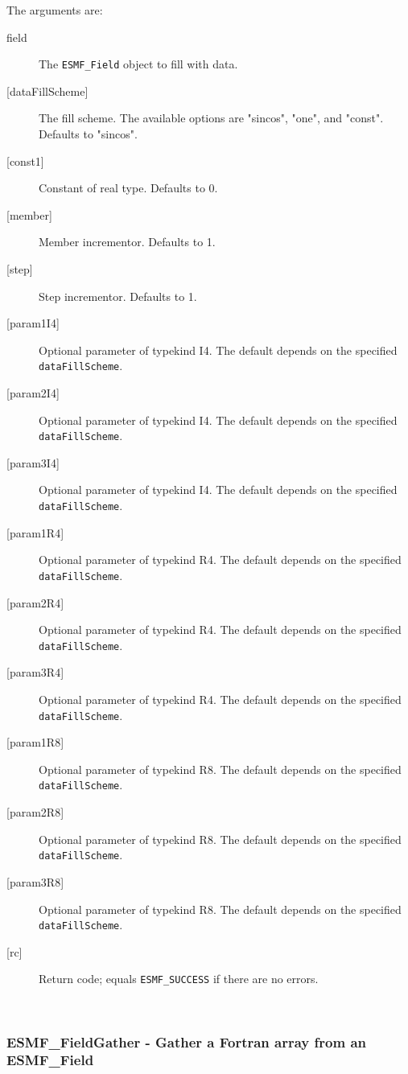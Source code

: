    The arguments are:
   \begin{description}
   \item[field]
   The {\tt ESMF\_Field} object to fill with data.
   \item[{[dataFillScheme]}]
   The fill scheme. The available options are "sincos", "one", and "const".
   Defaults to "sincos".
   \item[{[const1]}]
   Constant of real type. Defaults to 0.
   \item[{[member]}]
   Member incrementor. Defaults to 1.
   \item[{[step]}]
   Step incrementor. Defaults to 1.
   \item[{[param1I4]}]
   Optional parameter of typekind I4.
   The default depends on the specified {\tt dataFillScheme}.
   \item[{[param2I4]}]
   Optional parameter of typekind I4.
   The default depends on the specified {\tt dataFillScheme}.
   \item[{[param3I4]}]
   Optional parameter of typekind I4.
   The default depends on the specified {\tt dataFillScheme}.
   \item[{[param1R4]}]
   Optional parameter of typekind R4.
   The default depends on the specified {\tt dataFillScheme}.
   \item[{[param2R4]}]
   Optional parameter of typekind R4.
   The default depends on the specified {\tt dataFillScheme}.
   \item[{[param3R4]}]
   Optional parameter of typekind R4.
   The default depends on the specified {\tt dataFillScheme}.
   \item[{[param1R8]}]
   Optional parameter of typekind R8.
   The default depends on the specified {\tt dataFillScheme}.
   \item[{[param2R8]}]
   Optional parameter of typekind R8.
   The default depends on the specified {\tt dataFillScheme}.
   \item[{[param3R8]}]
   Optional parameter of typekind R8.
   The default depends on the specified {\tt dataFillScheme}.
   \item[{[rc]}]
   Return code; equals {\tt ESMF\_SUCCESS} if there are no errors.
   \end{description}
   
 
\mbox{}\hrulefill\ 
 

   \subsubsection [ESMF\_FieldGather] {ESMF\_FieldGather - Gather a Fortran array from an ESMF\_Field }


